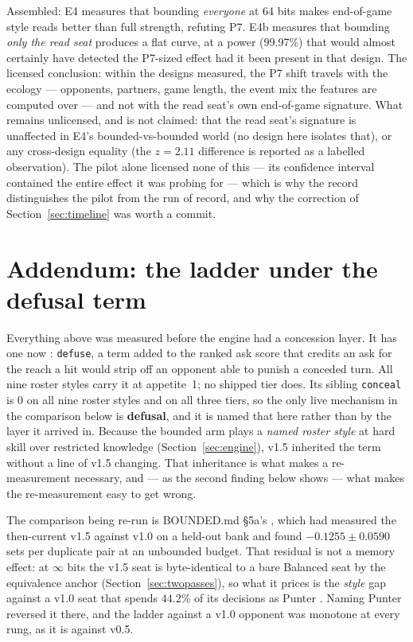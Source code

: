 \documentclass[11pt]{article}
\newcommand{\code}[1]{\texttt{#1}}
\begin{document}
Assembled: E4 measures that bounding \emph{everyone} at 64 bits makes end-of-game
style reads better than full strength, refuting P7. E4b measures that bounding
\emph{only the read seat} produces a flat curve, at a power (99.97\%) that would
almost certainly have detected the P7-sized effect had it been present in that design.
The licensed conclusion: within the designs measured, the P7 shift travels with the
ecology --- opponents, partners, game length, the event mix the features are computed
over --- and not with the read seat's own end-of-game signature. What remains
unlicensed, and is not claimed: that the read seat's signature is unaffected in E4's
bounded-vs-bounded world (no design here isolates that), or any cross-design equality
(the $z = 2.11$ difference is reported as a labelled observation). The pilot alone
licensed none of this --- its confidence interval contained the entire effect it was
probing for --- which is why the record distinguishes the pilot from the run of
record, and why the correction of Section~\ref{sec:timeline} was worth a commit.

\section{Addendum: the ladder under the defusal term}
\label{sec:defusal}

Everything above was measured before the engine had a concession layer. It has one now
\cite{v20paper,concession}: \code{defuse}, a term added to the ranked ask score that credits an
ask for the reach a hit would strip off an opponent able to punish a conceded turn. All nine
roster styles carry it at appetite~1; no shipped tier does. Its sibling \code{conceal} is $0$ on
all nine roster styles and on all three tiers, so the only live mechanism in the comparison below
is \textbf{defusal}, and it is named that here rather than by the layer it arrived in. Because
the bounded arm plays a \emph{named roster style} at hard skill over restricted knowledge
(Section~\ref{sec:engine}), v1.5 inherited the term without a line of v1.5 changing. That
inheritance is what makes a re-measurement necessary, and --- as the second finding below shows
--- what makes the re-measurement easy to get wrong.

The comparison being re-run is BOUNDED.md \S5a's \cite{bounded}, which had measured the
then-current v1.5 against v1.0 on a held-out bank and found $-0.1255 \pm 0.0590$ sets per
duplicate pair at an unbounded budget. That residual is not a memory effect: at $\infty$ bits the
v1.5 seat is byte-identical to a bare Balanced seat by the equivalence anchor
(Section~\ref{sec:twopasses}), so what it prices is the \emph{style} gap against a v1.0 seat that
spends $44.2\%$ of its decisions as Punter \cite{bounded}. Naming Punter reversed it there, and
the ladder against a v1.0 opponent was monotone at every rung, as it is against v0.5.
\end{document}
